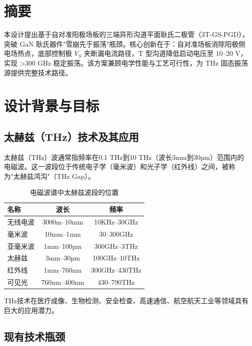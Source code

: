 \documentclass[12pt,a4paper]{article}
\begin{document}

\maketoc

\section*{摘要}
本设计提出基于自对准阳极场板的三端异形沟道平面耿氏二极管（3T-GS-PGD），突破 GaN 耿氏器件"雪崩先于振荡"瓶颈。核心创新在于：自对准场板消除阳极侧电场热点，底部控制极 $V_S$ 夹断漏电流路径，T 型沟道降低启动电压至 10--20 V，实现 >300 GHz 稳定振荡。该方案兼顾电学性能与工艺可行性，为 THz 固态振荡源提供完整技术路径。

\section{设计背景与目标}

\subsection{太赫兹（THz）技术及其应用}

太赫兹（THz）波通常指频率在0.1 THz到10 THz（波长3mm到30µm）范围内的电磁波。这一波段位于传统电子学（毫米波）和光子学（红外线）之间，被称为"太赫兹鸿沟"（THz Gap）。

\begin{table}[H]
    \centering
    \caption{电磁波谱中太赫兹波段的位置}
    \begin{tabular}{lcc}
        \toprule
        \textbf{名称} & \textbf{波长} & \textbf{频率} \\
        \midrule
        无线电波 & 3000m--10mm & 10KHz--30GHz \\
        毫米波 & 10mm--1mm & 30--300GHz \\
        亚毫米波 & 1mm--100µm & 300GHz--3THz \\
        \rowcolor{blue!10} 太赫兹 & 3mm--30µm & 100GHz--10THz \\
        红外线 & 1mm--760nm & 300GHz--430THz \\
        可见光 & 760nm--400nm & 430--790THz \\
        \bottomrule
    \end{tabular}
\end{table}

THz技术在医疗成像、生物检测、安全检查、高速通信、航空航天工业等领域具有巨大的应用潜力\cite{tonouchi2007cutting}\cite{siegel2004terahertz}。

\subsection{现有技术瓶颈}
\end{document}
